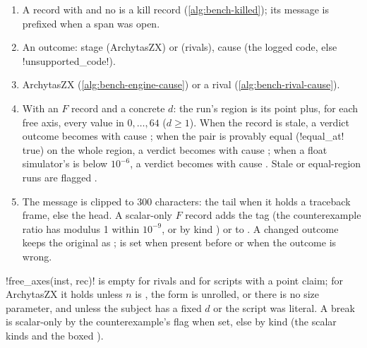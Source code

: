 \begin{algorithm}\label{alg:bench-classify}
\begin{enumerate}
\item A record with  and no  is a kill record
  (\cref{alg:bench-killed}); its message is prefixed  when a span was open.
\item An  outcome: stage  (ArchytasZX) or 
  (rivals), cause  (the logged code, else \py!unsupported_code!).
\item ArchytasZX (\cref{alg:bench-engine-cause}) or a rival (\cref{alg:bench-rival-cause}).
\item With an $F$ record and a concrete $d$: the run's region is its point plus, for each free
  axis, every value in $0,\dots,64$ ($d\ge1$). When the record is stale, a verdict outcome becomes
   with cause ; when the pair is provably equal
  (\py!equal_at! true) on the whole region, a verdict becomes  with cause
  ; when a float simulator's  is below
  $10^{-6}$, a verdict becomes  with cause
  . Stale or equal-region runs are flagged
  .
\item The message is clipped to 300 characters: the tail when it holds a traceback frame, else
  the head. A scalar-only $F$ record adds the tag  (the counterexample ratio
  has modulus 1 within $10^{-9}$, or by kind ) or  to
  . A changed outcome keeps the original as ;  is set
  when present before or when the outcome is wrong.
\end{enumerate}
\end{algorithm}

\py!free_axes(inst, rec)! is empty for rivals and for scripts with a point claim; for ArchytasZX
it holds  unless $n$ is , the form is unrolled, or there is no size parameter,
and  unless the subject has a fixed $d$ or the script was literal. A break is scalar-only
by the counterexample's  flag when set, else by kind (the scalar kinds and the
boxed ).

